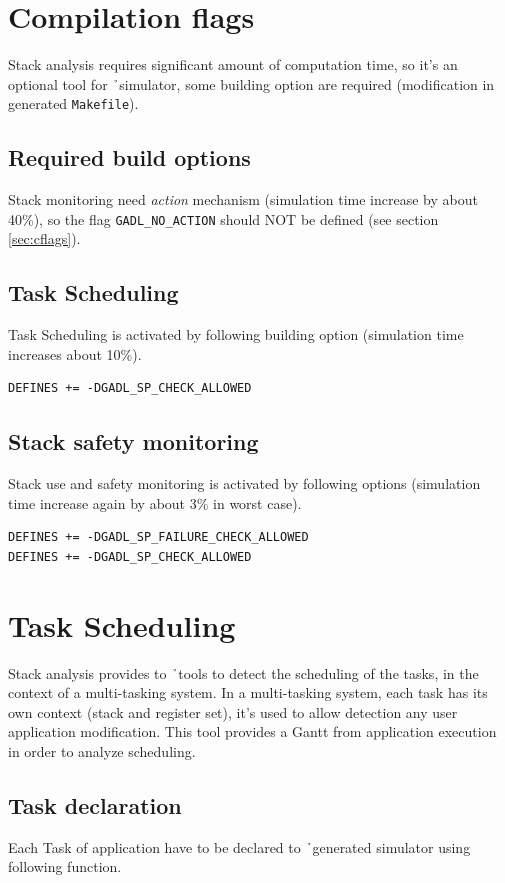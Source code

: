 \section{Compilation flags}
Stack analysis requires significant amount of computation time, so it's an optional tool for \h\ simulator, some building option are required (modification in generated \texttt{Makefile}).

\subsection{Required build options}
Stack monitoring need \emph{action} mechanism (simulation time increase by about 40\%), so the flag \texttt{GADL\_NO\_ACTION} should NOT be defined (see section \ref{sec:cflags}).

\subsection{Task Scheduling}
\noindent Task Scheduling is activated by following building option (simulation time increases about 10\%).
\begin{verbatim}
DEFINES += -DGADL_SP_CHECK_ALLOWED
\end{verbatim}

\subsection{Stack safety monitoring}
\noindent Stack use and safety monitoring is activated by following options (simulation time increase again by about  3\% in worst case).
\begin{verbatim}
DEFINES += -DGADL_SP_FAILURE_CHECK_ALLOWED 
DEFINES += -DGADL_SP_CHECK_ALLOWED
\end{verbatim}

\section{Task Scheduling}
Stack analysis provides to \h\ tools to detect the scheduling of the tasks, in the context of a multi-tasking system. In a multi-tasking system, each task has its own context (stack and register set), it's used to allow detection any user application modification. This tool provides a Gantt from application execution in order to analyze scheduling.

\subsection{Task declaration}
Each Task of application have to be declared to \h\ generated simulator using following function.


